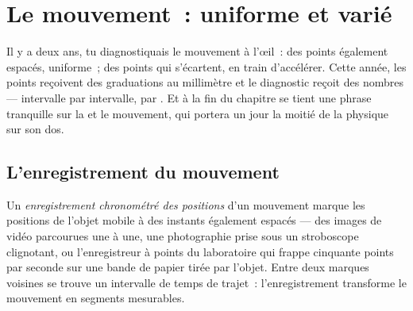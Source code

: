 \chapter{Le mouvement~: uniforme et varié}\label{ch:g9:uniform-varied-motion}

Il y a deux ans, tu diagnostiquais le mouvement à l'œil~: des points
également espacés, uniforme~; des points qui s'écartent, en train
d'accélérer. Cette année, les points reçoivent des graduations au
millimètre et le diagnostic reçoit des nombres --- intervalle par
intervalle,  par . Et à la fin du chapitre se tient une
phrase tranquille sur la  et le mouvement, qui portera un jour la
moitié de la physique sur son dos.

\section{L'enregistrement du mouvement}

\begin{definition}\label{def:g9:uniform-varied-motion:record}
Un \emph{enregistrement chronométré des positions}
d'un mouvement marque les positions de l'objet mobile à des instants
également espacés --- des images de vidéo parcourues une à une, une
photographie prise sous un stroboscope clignotant, ou l'enregistreur à
points du laboratoire qui frappe cinquante points par seconde sur une
bande de papier tirée par l'objet. Entre deux marques voisines se
trouve un intervalle de temps de trajet~: l'enregistrement transforme
le mouvement en segments mesurables.
\end{definition}

